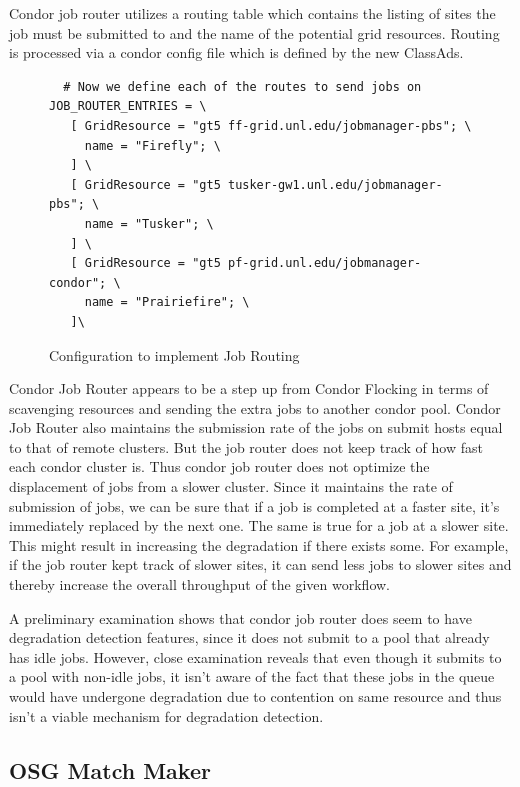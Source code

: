 \documentclass[ms,electronic,double]{nuthesis}
\begin{document}
Condor job router utilizes a routing table which contains the listing of sites 
the job must be submitted to and the name of the potential grid resources. Routing is processed via a  condor config file which is defined by the new ClassAds.

\begin{figure}
\begin{lstlisting}
  # Now we define each of the routes to send jobs on
JOB_ROUTER_ENTRIES = \
   [ GridResource = "gt5 ff-grid.unl.edu/jobmanager-pbs"; \
     name = "Firefly"; \
   ] \
   [ GridResource = "gt5 tusker-gw1.unl.edu/jobmanager-pbs"; \
     name = "Tusker"; \
   ] \
   [ GridResource = "gt5 pf-grid.unl.edu/jobmanager-condor"; \
     name = "Prairiefire"; \
   ]\

\end{lstlisting}
\caption{Configuration to implement Job Routing}
\end{figure}

Condor Job Router appears to be a step up from Condor Flocking in terms of 
scavenging resources and sending the extra jobs to another condor pool. Condor 
Job Router also maintains the submission rate of the jobs on submit hosts equal to that of remote clusters. But the job 
router does not keep track of how fast each condor cluster is. Thus 
condor job router does not optimize the displacement of jobs from a slower 
cluster. Since it maintains the rate of submission of jobs, we can be sure that if a job is completed 
at a faster site, it's immediately replaced by the next one. The same is true for a job at a slower site.
This might result in increasing the degradation if there exists some. For example, if the job router kept track of slower sites, it
can send less jobs to slower sites and thereby increase the overall throughput of the given workflow.

A preliminary examination shows that condor job router does seem to have degradation detection features, 
since it does not submit to a pool that already has idle jobs. However, close examination reveals that even though it
submits to a pool with non-idle jobs, it isn't aware of the fact that these jobs in the queue would have 
undergone degradation due to contention on same resource and thus isn't a viable mechanism for degradation detection.

\subsection{OSG Match Maker}
\end{document}
